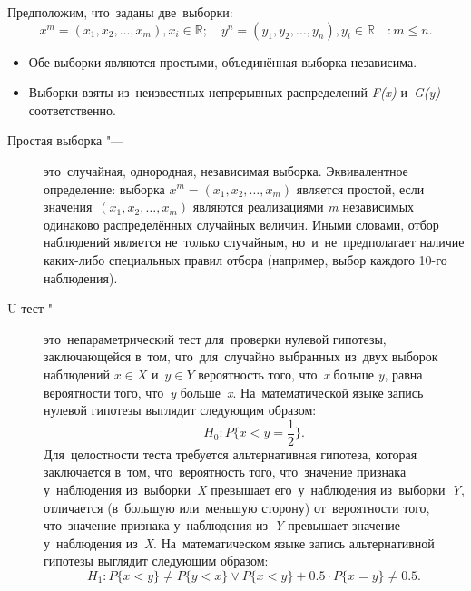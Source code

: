 \documentclass[]{scrreprt}
\begin{document}
Предположим, что~заданы две~выборки:
\begin{equation*}
	x^{m} = (x_{1},x_{2},\ldots,x_{m}), x_{i} \in \mathbb{R};\quad y^{n} = (y_{1},y_{2},\ldots,y_{n}), y_{i} \in \mathbb{R} \quad: m \leq n.
\end{equation*}
 
\begin{itemize}
	\item Обе выборки являются простыми, объединённая выборка независима.
	\item Выборки взяты из~неизвестных непрерывных распределений \textit{F(x)} и~\textit{G(y)} соответственно.
\end{itemize}
 
\begin{description}
	\item[Простая выборка "---] это~случайная, однородная, независимая выборка. Эквивалентное определение: выборка ${\textstyle x^{m} = (x_{1},x_{2},\ldots,x_{m})}$ является простой, если значения~${\textstyle (x_{1},x_{2},\ldots,x_{m})}$ являются реализациями \textit{m} независимых одинаково распределённых случайных величин. Иными словами, отбор наблюдений является не~только случайным, но~и~не~предполагает наличие каких-либо специальных правил отбора (например, выбор каждого 10-го наблюдения).
\end{description}
\begin{description}
	\item[U-тест "---] это~непараметрический тест для~проверки нулевой гипотезы, заключающейся в~том, что~для~случайно выбранных из~двух выборок наблюдений ${\textstyle x \in X}$ и~${\textstyle y \in Y}$ вероятность того, что~\textit{x} больше \textit{y}, равна вероятности того, что~\textit{y} больше~\textit{x}. На~математической языке запись нулевой гипотезы выглядит следующим образом:
	\begin{equation}\label{eq:U-test-null-hypothesis}
	H_{0}:P\{x<y=\frac{1}{2}\}.
	\end{equation}
	Для~целостности теста требуется альтернативная гипотеза, которая заключается в~том, что~вероятность того, что~значение признака у~наблюдения из~выборки~\textit{X} превышает его~у~наблюдения из~выборки~\textit{Y}, отличается (в~большую или~меньшую сторону) от~вероятности того, что~значение признака у~наблюдения из~\textit{Y} превышает значение у~наблюдения из~\textit{X}. На~математическом языке запись альтернативной гипотезы выглядит следующим образом:
	\begin{equation}\label{eq:U-test-alt-hypothesis}
	H_{1}:P\{x<y\} \neq P\{y<x\} \vee P\{x<y\} + 0.5 \cdot P\{x=y\} \neq 0.5.
	\end{equation}
\end{description}
\end{document}
